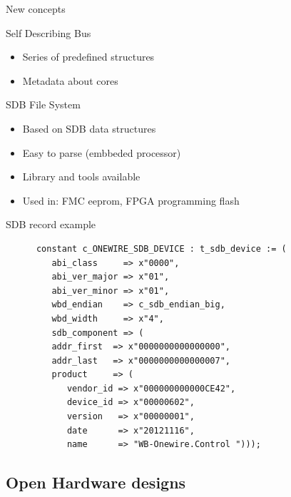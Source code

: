 \documentclass[compress,red]{beamer}
\begin{document}
\begin{frame}{New concepts}

  \begin{block}{Self Describing Bus}
    \begin{itemize}
    \item Series of predefined structures
    \item Metadata about cores
    \end{itemize}
  \end{block}

  \begin{block}{SDB File System}
    \begin{itemize}
    \item Based on SDB data structures
    \item Easy to parse (embbeded processor)
    \item Library and tools available %
    \item Used in: FMC eeprom, FPGA programming flash
    \end{itemize}
  \end{block}

\end{frame}

\begin{frame}[fragile]{SDB record example}

    \begin{verbatim}
      constant c_ONEWIRE_SDB_DEVICE : t_sdb_device := (
         abi_class     => x"0000",
         abi_ver_major => x"01",
         abi_ver_minor => x"01",
         wbd_endian    => c_sdb_endian_big,
         wbd_width     => x"4",
         sdb_component => (
         addr_first  => x"0000000000000000",
         addr_last   => x"0000000000000007",
         product     => (
            vendor_id => x"000000000000CE42",
            device_id => x"00000602",
            version   => x"00000001",
            date      => x"20121116",
            name      => "WB-Onewire.Control ")));
    \end{verbatim}

\end{frame}

\subsection{Open Hardware designs}
\end{document}
